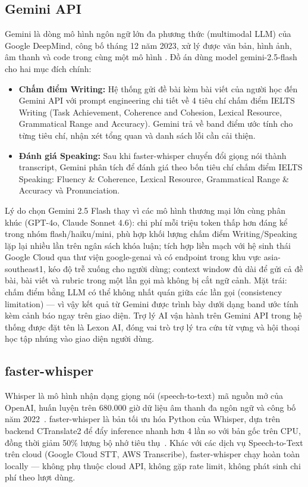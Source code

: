 \subsection{Gemini API}

Gemini là dòng mô hình ngôn ngữ lớn đa phương thức (multimodal LLM) của Google DeepMind, công bố tháng 12 năm 2023, xử lý được văn bản, hình ảnh, âm thanh và code trong cùng một mô hình \cite{gemini-api}. Đồ án dùng model gemini-2.5-flash cho hai mục đích chính:

\begin{itemize}
    \item \textbf{Chấm điểm Writing:} Hệ thống gửi đề bài kèm bài viết của người học đến Gemini API với prompt engineering chi tiết về 4 tiêu chí chấm điểm IELTS Writing (Task Achievement, Coherence and Cohesion, Lexical Resource, Grammatical Range and Accuracy). Gemini trả về band điểm ước tính cho từng tiêu chí, nhận xét tổng quan và danh sách lỗi cần cải thiện.
    \item \textbf{Đánh giá Speaking:} Sau khi faster-whisper chuyển đổi giọng nói thành transcript, Gemini phân tích để đánh giá theo bốn tiêu chí chấm điểm IELTS Speaking: Fluency \& Coherence, Lexical Resource, Grammatical Range \& Accuracy và Pronunciation.
\end{itemize}

Lý do chọn Gemini 2.5 Flash thay vì các mô hình thương mại lớn cùng phân khúc (GPT-4o, Claude Sonnet 4.6): chi phí mỗi triệu token thấp hơn đáng kể trong nhóm flash/haiku/mini, phù hợp khối lượng chấm điểm Writing/Speaking lặp lại nhiều lần trên ngân sách khóa luận; tích hợp liền mạch với hệ sinh thái Google Cloud qua thư viện google-genai và có endpoint trong khu vực asia-southeast1, kéo độ trễ xuống cho người dùng; context window đủ dài để gửi cả đề bài, bài viết và rubric trong một lần gọi mà không bị cắt ngữ cảnh. Mặt trái: chấm điểm bằng LLM có thể không nhất quán giữa các lần gọi (consistency limitation) --- vì vậy kết quả từ Gemini được trình bày dưới dạng band ước tính kèm cảnh báo ngay trên giao diện. Trợ lý AI vận hành trên Gemini API trong hệ thống được đặt tên là Lexon AI, đóng vai trò trợ lý tra cứu từ vựng và hội thoại học tập nhúng vào giao diện người dùng.

\subsection{faster-whisper}

Whisper là mô hình nhận dạng giọng nói (speech-to-text) mã nguồn mở của OpenAI, huấn luyện trên 680.000 giờ dữ liệu âm thanh đa ngôn ngữ và công bố năm 2022~\cite{whisper-paper}. faster-whisper là bản tối ưu hóa Python của Whisper, dựa trên backend CTranslate2 để đẩy inference nhanh hơn 4 lần so với bản gốc trên CPU, đồng thời giảm 50\% lượng bộ nhớ tiêu thụ~\cite{faster-whisper-docs}. Khác với các dịch vụ Speech-to-Text trên cloud (Google Cloud STT, AWS Transcribe), faster-whisper chạy hoàn toàn locally --- không phụ thuộc cloud API, không gặp rate limit, không phát sinh chi phí theo lượt dùng.

